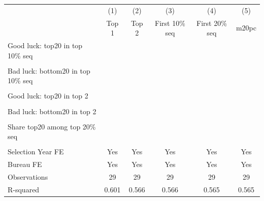 {
\def\sym#1{\ifmmode^{#1}\else\(^{#1}\)\fi}
\begin{tabular}{l*{5}{c}}
\toprule
                    &\multicolumn{1}{c}{(1)}&\multicolumn{1}{c}{(2)}&\multicolumn{1}{c}{(3)}&\multicolumn{1}{c}{(4)}&\multicolumn{1}{c}{(5)}\\
                    &\multicolumn{1}{c}{Top 1}&\multicolumn{1}{c}{Top 2}&\multicolumn{1}{c}{First 10\% seq}&\multicolumn{1}{c}{First 20\% seq}&\multicolumn{1}{c}{m20pc}\\
\midrule
Good luck: top20 in top 10\% seq&                     &                     &                     &                     &                     \\
                    &                     &                     &                     &                     &                     \\
Bad luck: bottom20 in top 10\% seq&                     &                     &                     &                     &                     \\
                    &                     &                     &                     &                     &                     \\
Good luck: top20 in top 2&                     &                     &                     &                     &                     \\
                    &                     &                     &                     &                     &                     \\
Bad luck: bottom20 in top 2&                     &                     &                     &                     &                     \\
                    &                     &                     &                     &                     &                     \\
Share top20 among top 20\% seq&                     &                     &                     &                     &                     \\
                    &                     &                     &                     &                     &                     \\
\midrule
Selection Year FE   &         Yes         &         Yes         &         Yes         &         Yes         &         Yes         \\
Bureau FE           &         Yes         &         Yes         &         Yes         &         Yes         &         Yes         \\
Observations        &          29         &          29         &          29         &          29         &          29         \\
R-squared           &       0.601         &       0.566         &       0.566         &       0.565         &       0.565         \\
\bottomrule
\end{tabular}
}
